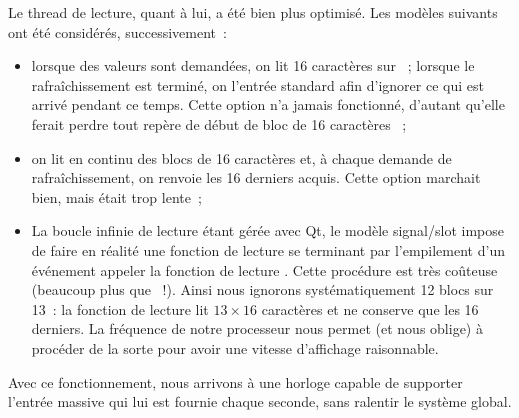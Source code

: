 \documentclass[11pt,a4paper]{article}
\begin{document}
Le thread de lecture, quant à lui, a été bien plus optimisé. Les modèles suivants ont été considérés, successivement~:
\begin{itemize}
\item lorsque des valeurs sont demandées, on lit 16 caractères sur ~; lorsque le rafraîchissement est terminé, on  l'entrée standard afin d'ignorer ce qui est arrivé pendant ce temps. Cette option n'a jamais fonctionné, d'autant qu'elle ferait perdre tout repère de \og début de bloc de 16 caractères \fg{}~;

\item on lit en continu des blocs de 16 caractères et, à chaque demande de rafraîchissement, on renvoie les 16 derniers acquis. Cette option marchait bien, mais était trop lente~;

\item La \og boucle infinie \fg{} de lecture étant gérée avec Qt, le modèle signal/slot impose de faire en réalité une fonction de lecture se terminant par l'empilement d'un événement \og appeler la fonction de lecture \fg{}. Cette procédure est très coûteuse (beaucoup plus que ~!). Ainsi nous ignorons systématiquement 12 blocs sur 13~: la fonction de lecture lit $13 \times 16$ caractères et ne conserve que les 16 derniers. La fréquence de notre processeur nous permet (et nous oblige) à procéder de la sorte pour avoir une vitesse d'affichage raisonnable.
\end{itemize}

Avec ce fonctionnement, nous arrivons à une horloge capable de supporter l'entrée massive qui lui est fournie chaque seconde, sans ralentir le système global.
\end{document}
